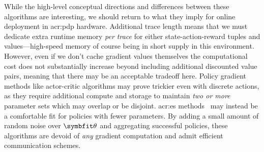 While the high-level conceptual directions and differences between these algorithms are interesting, we should return to what they imply for online deployment in \gls{acr:pdp} hardware.
Additional trace length means that we must dedicate extra runtime memory \emph{per trace} for either state-action-reward tuples and values---high-speed memory of course being in short supply in this environment.
However, even if we don't cache gradient values themselves the computational cost does not substantially increase beyond including additional discounted value pairs, meaning that there may be an acceptable tradeoff here.
Policy gradient methods like actor-critic algorithms may prove trickier even with discrete actions, as they require additional compute and storage to maintain \emph{two or more} parameter sets which may overlap or be disjoint.
\gls{acr:es} methods~\parencite{DBLP:journals/corr/SalimansHCS17,DBLP:journals/corr/abs-1802-08842} may instead be a comfortable fit for policies with fewer parameters.
By adding a small amount of random noise over $\wvec{}$ and aggregating successful policies, these algorithms are devoid of \emph{any} gradient computation and admit efficient communication schemes.

%
%

